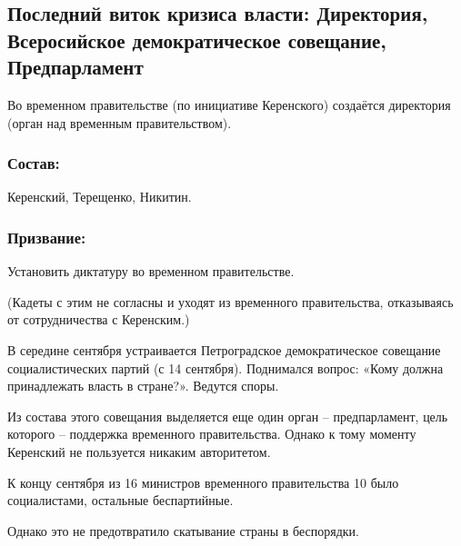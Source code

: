 \subsection{Последний виток кризиса власти: Директория, Всеросийское демократическое совещание, Предпарламент}

Во временном правительстве (по инициативе Керенского) создаётся директория (орган над временным правительством).

\subsubsection{\textbf{Состав:}}

Керенский, Терещенко, Никитин.

\subsubsection{\textbf{Призвание:}}

Установить диктатуру во временном правительстве.

(Кадеты с этим не согласны и уходят из временного правительства, отказываясь от сотрудничества с Керенским.)

В середине сентября устраивается Петроградское демократическое совещание социалистических партий (с 14 сентября). Поднимался вопрос: «Кому должна принадлежать власть в стране?». Ведутся споры.

Из состава этого совещания выделяется еще один орган – предпарламент, цель которого -- поддержка временного правительства. Однако к тому моменту Керенский не пользуется никаким авторитетом.

К концу сентября из 16 министров временного правительства 10 было социалистами, остальные беспартийные.

Однако это не предотвратило скатывание страны в беспорядки.